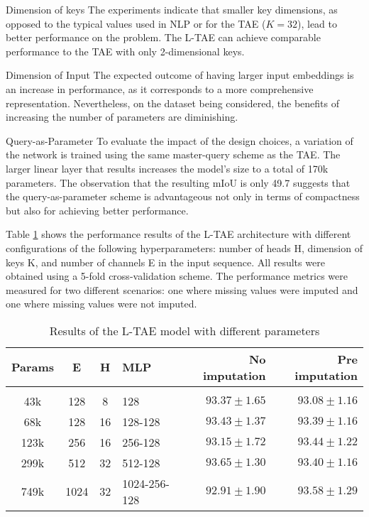 \begin{paragraph} {Dimension of keys}
The experiments indicate that smaller key dimensions, as opposed to the typical values used in NLP or for the TAE ($K = 32$), lead to better performance on the problem.
The L-TAE can achieve comparable performance to the TAE with only 2-dimensional keys.
\end{paragraph}

\begin{paragraph} {Dimension of Input}
The expected outcome of having larger input embeddings is an increase in performance, as it corresponds to a more comprehensive representation.
Nevertheless, on the dataset being considered, the benefits of increasing the number of parameters are diminishing.
\end{paragraph}

\begin{paragraph} {Query-as-Parameter}
To evaluate the impact of the design choices, a variation of the network is trained using the same master-query scheme as the TAE.
The larger linear layer that results increases the model's size to a total of 170k parameters.
The observation that the resulting mIoU is only 49.7 suggests that the query-as-parameter scheme is advantageous not only in terms of compactness but also for achieving better performance.
\end{paragraph}

Table \ref{tab:LTAEresults} shows the performance results of the L-TAE architecture with different configurations of the following hyperparameters: number of heads H, dimension of keys K, and number of channels E in the input sequence.
All results were obtained using a 5-fold cross-validation scheme.
The performance metrics were measured for two different scenarios: one where missing values were imputed and one where missing values were not imputed.

\begin{table}[H]
  \centering
  \begin{tabular}{ccclrr} 
     Params & E & H & MLP & No imputation & Pre imputation\\[0.2cm] 
     \hline \\[-0.2cm] 
     43k & 	128 & 	8 & 	128 & 	$93.37 \pm 1.65$ & 	$93.08 \pm 1.16$\\ 
     68k & 	128 & 	16 & 	128-128 & 	$93.43 \pm 1.37$ & 	$93.39 \pm 1.16$\\ 
     123k & 	256 & 	16 & 	256-128 & 	$93.15 \pm 1.72$ & 	$93.44 \pm 1.22$\\ 
     299k & 	512 & 	32 & 	512-128 & 	$\mathbf{93.65 \pm 1.30}$ & 	$93.40 \pm 1.16$\\ 
     749k & 	1024 & 	32 & 	1024-256-128 & 	$92.91 \pm 1.90$ & 	$\mathbf{93.58 \pm 1.29}$\\ 
  \end{tabular}
  \caption{Results of the L-TAE model with different parameters}
  \label{tab:LTAEresults}
\end{table}

